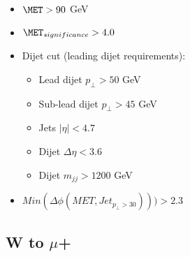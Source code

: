 \begin{itemize}
\begin{itemize}
  \end{itemize}
  \item $ \MET > 90 $ GeV
  \item $ \MET_{significance} > 4.0 $
  \item Dijet cut (leading dijet requirements):
  \begin{itemize}
    \item Lead dijet $ p_{\perp} > 50$ GeV
    \item Sub-lead dijet $ p_{\perp} > 45$ GeV
    \item Jets $ |\eta| < 4.7 $
    \item Dijet $ \Delta\eta < 3.6 $
    \item Dijet $ m_{jj} > 1200 $ GeV
  \end{itemize}
  \item $ Min(\Delta\phi(MET,Jet_{p_{\perp}>30})))>2.3 $
\end{itemize}




\subsection{W to \texorpdfstring{$\mu$+\MET}{muon+MET}}

